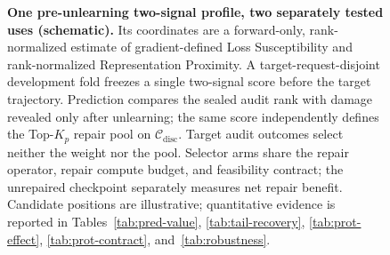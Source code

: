 \begin{figure}[!t]
\caption{\textbf{One pre-unlearning two-signal profile, two separately tested
uses (schematic).}
Its coordinates are a forward-only, rank-normalized estimate of
gradient-defined Loss Susceptibility and rank-normalized Representation Proximity. A
target-request-disjoint development fold freezes a single two-signal score before the
target trajectory. Prediction compares the sealed audit rank with damage
revealed only after unlearning; the same score independently defines the Top-$K_p$
repair pool on $\mathcal C_{\mathrm{disc}}$. Target audit outcomes
select neither the weight nor the pool. Selector arms share the repair operator, repair compute budget, and
feasibility contract; the unrepaired checkpoint separately measures net repair
benefit. Candidate positions are illustrative;
quantitative evidence is reported in Tables~\ref{tab:pred-value},
\ref{tab:tail-recovery}, \ref{tab:prot-effect},
\ref{tab:prot-contract}, and~\ref{tab:robustness}.}


\label{fig:profile-two-uses}
\end{figure}
